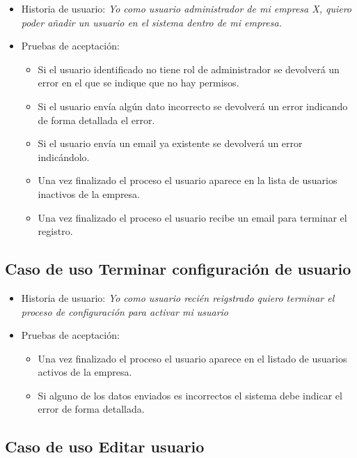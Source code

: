 \documentclass[12pt,a4paperpaper,]{report}
\providecommand{\tightlist}{%
  \setlength{\itemsep}{0pt}\setlength{\parskip}{0pt}}
\begin{document}
\begin{itemize}
\tightlist
\item
  Historia de usuario: \emph{Yo como usuario administrador de mi empresa
  X, quiero poder añadir un usuario en el sistema dentro de mi empresa.}
\item
  Pruebas de aceptación:

  \begin{itemize}
  \tightlist
  \item
    Si el usuario identificado no tiene rol de administrador se
    devolverá un error en el que se indique que no hay permisos.
  \item
    Si el usuario envía algún dato incorrecto se devolverá un error
    indicando de forma detallada el error.
  \item
    Si el usuario envía un email ya existente se devolverá un error
    indicándolo.
  \item
    Una vez finalizado el proceso el usuario aparece en la lista de
    usuarios inactivos de la empresa.
  \item
    Una vez finalizado el proceso el usuario recibe un email para
    terminar el registro.
  \end{itemize}
\end{itemize}

\subsection{Caso de uso Terminar configuración de
usuario}\label{caso-de-uso-terminar-configuraciuxf3n-de-usuario-1}

\begin{itemize}
\tightlist
\item
  Historia de usuario: \emph{Yo como usuario recién reigstrado quiero
  terminar el proceso de configuración para activar mi usuario}
\item
  Pruebas de aceptación:

  \begin{itemize}
  \tightlist
  \item
    Una vez finalizado el proceso el usuario aparece en el listado de
    usuarios activos de la empresa.
  \item
    Si alguno de los datos enviados es incorrectos el sistema debe
    indicar el error de forma detallada.
  \end{itemize}
\end{itemize}

\subsection{Caso de uso Editar
usuario}\label{caso-de-uso-editar-usuario-2}
\end{document}
